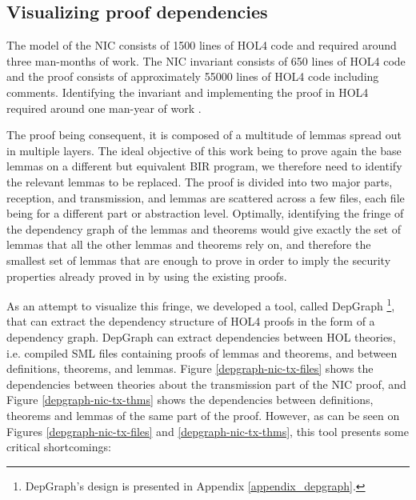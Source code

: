 \documentclass{kththesis}
\begin{document}
{\subsection{Visualizing proof dependencies}

The model of the NIC consists of \num{1500} lines of HOL4 code and required around three man-months of work. The NIC invariant consists of \num{650} lines of HOL4 code and the proof consists of approximately \num{55000} lines of HOL4 code including comments. Identifying the invariant and implementing the proof in HOL4 required around one man-year of work \cite{haglund_trustworthy_nodate}.

The proof being consequent, it is composed of a multitude of
lemmas spread out in multiple layers. The ideal objective of this work
 being to prove again the base lemmas on a different but
equivalent BIR program, we therefore need to identify the
relevant lemmas to be replaced. The proof is divided into two major
parts, reception, and transmission, and lemmas are scattered across a few files, each file being for a different part or abstraction level. Optimally, identifying the fringe of the dependency graph of the lemmas and theorems would give exactly the set of lemmas that all the other lemmas and theorems rely on, and therefore the smallest set of lemmas that are enough to prove in order to imply the security properties already proved in \cite{haglund_trustworthy_nodate} by using the existing proofs.

As an attempt to visualize this fringe, we developed a tool, called DepGraph \footnote{DepGraph's design is presented in Appendix \ref{appendix_depgraph}.}, that can extract the dependency structure of HOL4 proofs in the form of a dependency graph. DepGraph can extract dependencies between HOL theories, i.e. compiled \gls{SML} files containing proofs of lemmas and theorems, and between definitions, theorems, and lemmas. Figure \ref{depgraph-nic-tx-files} shows the dependencies between theories about the transmission part of the NIC proof, and Figure \ref{depgraph-nic-tx-thms} shows the dependencies between definitions, theorems and lemmas of the same part of the proof. However, as can be seen on Figures \ref{depgraph-nic-tx-files} and \ref{depgraph-nic-tx-thms}, this tool presents some critical shortcomings:

}
\end{document}
